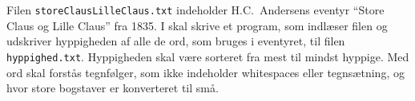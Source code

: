 Filen \lstinline!storeClausLilleClaus.txt! indeholder H.C.\ Andersens eventyr ``Store Claus og Lille Claus'' fra 1835. I skal skrive et program, som indlæser filen og udskriver hyppigheden af alle de ord, som bruges i eventyret, til filen \lstinline!hyppighed.txt!. Hyppigheden skal være sorteret fra mest til mindst hyppige. Med ord skal forstås tegnfølger, som ikke indeholder whitespaces eller tegnsætning, og hvor store bogstaver er konverteret til små. 